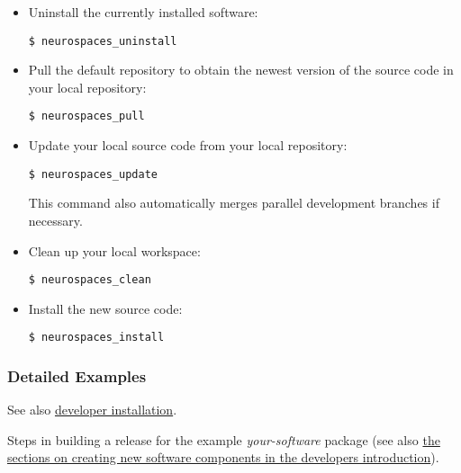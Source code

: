 \documentclass[12pt]{article}
\begin{document}
\begin{itemize}
\item Uninstall the currently installed software:
\begin{verbatim}
$ neurospaces_uninstall
\end{verbatim}

\item Pull the default repository to obtain the newest version of the
  source code in your local repository:
\begin{verbatim}
$ neurospaces_pull
\end{verbatim}

\item Update your local source code from your local repository:
\begin{verbatim}
$ neurospaces_update
\end{verbatim}
  This command also automatically merges parallel development branches
  if necessary.

\item Clean up your local workspace:
\begin{verbatim}
$ neurospaces_clean
\end{verbatim}

\item Install the new source code:
\begin{verbatim}
$ neurospaces_install
\end{verbatim}
\end{itemize}


\subsubsection*{Detailed Examples}

See also
\href{../installation-developer/installation-developer.tex}{developer
  installation}.

Steps in building a release for the example {\it your-software}
package (see also \href{../developers-intro/developers-intro.tex}{the
  sections on creating new software components in the developers
  introduction}).
\end{document}
